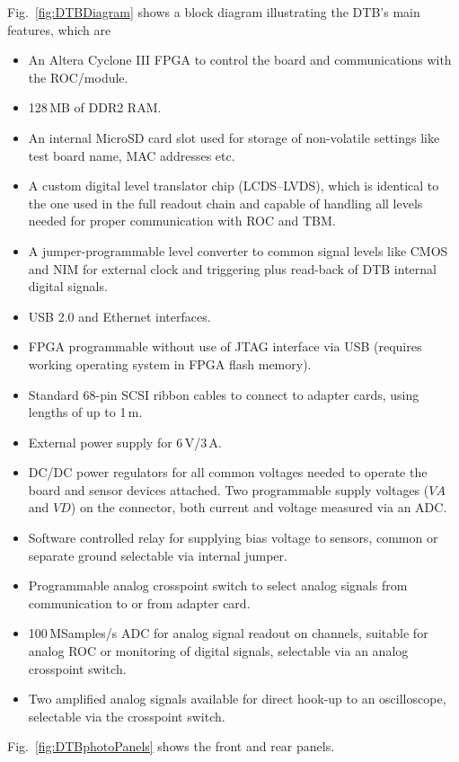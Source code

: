 Fig.~\ref{fig:DTBDiagram} shows a block diagram illustrating the DTB's main features, which are
\begin{itemize}
    \item An Altera Cyclone III FPGA to control the board and communications with the \gls{ROC}/module.
    \item 128\,MB of DDR2 RAM.
    \item An internal MicroSD card slot used for storage of non-volatile settings like test board name, MAC addresses etc. 
    \item A custom digital level translator chip (LCDS--LVDS), which is identical to the one used in the full readout chain and capable of handling all levels needed for proper communication with ROC and TBM.
    \item A jumper-programmable level converter to common signal levels like CMOS and NIM for external clock and triggering plus read-back of DTB internal digital signals.
    \item USB 2.0 and Ethernet interfaces.
    \item FPGA programmable without use of JTAG interface via USB (requires working operating system in FPGA flash memory).
    \item Standard 68-pin SCSI ribbon cables to connect to adapter cards, using lengths of up to 1\,m.
    \item External power supply for 6\,V/3\,A.
    \item DC/DC power regulators for all common voltages needed to operate the board and sensor devices attached. Two programmable supply voltages ($VA$ and $VD$) on the connector, both current and voltage measured via an ADC.
    \item Software controlled relay for supplying bias voltage to sensors, common or separate ground selectable via internal jumper.
    \item Programmable analog crosspoint switch to select analog signals from communication to or from adapter card.
    \item 100\,MSamples/s ADC for analog signal readout on channels, suitable for analog \gls{ROC} or monitoring of digital signals, selectable via an analog crosspoint switch.
    \item Two amplified analog signals available for direct hook-up to an oscilloscope, selectable via the crosspoint switch.
\end{itemize}
Fig.~\ref{fig:DTBphotoPanels} shows the front and rear panels.

